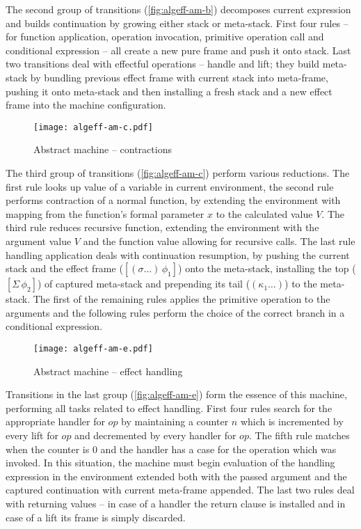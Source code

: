 \documentclass[inz, english, longabstract]{iithesis}
\begin{document}
The second group of transitions (\autoref{fig:algeff-am-b}) decomposes current expression and builds continuation by growing either stack or meta-stack.
First four rules -- for function application, operation invocation, primitive operation call and conditional expression -- all create a new pure frame and push it onto stack.
Last two transitions deal with effectful operations -- handle and lift; they build meta-stack by bundling previous effect frame with current stack into meta-frame, pushing it onto meta-stack and then installing a fresh stack and a new effect frame into the machine configuration.

\begin{figure}[t]
  \centering 
  \texttt{[image: algeff-am-c.pdf]}
  \caption{Abstract machine -- contractions}
  \label{fig:algeff-am-c}
\end{figure}

The third group of transitions (\autoref{fig:algeff-am-c}) perform various reductions.
The first rule looks up value of a variable in current environment, the second rule performs contraction of a normal function, by extending the environment with mapping from the function's formal parameter $ x $ to the calculated value $ V $.
The third rule reduces recursive function, extending the environment with the argument value $ V $ and the function value allowing for recursive calls.
The last rule handling application deals with continuation resumption, by pushing the current stack and the effect frame ($ [(\sigma \ldots) \, \phi_1] $) onto the meta-stack, installing the top ($ [\Sigma \, \phi_2] $) of captured meta-stack and prepending its tail ($ (\kappa_1 \ldots) $) to the meta-stack.
The first of the remaining rules applies the primitive operation to the arguments and the following rules perform the choice of the correct branch in a conditional expression.

\begin{figure}[t]
  \centering
  \texttt{[image: algeff-am-e.pdf]}
  \caption{Abstract machine -- effect handling}
  \label{fig:algeff-am-e}
\end{figure}

Transitions in the last group (\autoref{fig:algeff-am-e}) form the essence of this machine, performing all tasks related to effect handling.
First four rules search for the appropriate handler for $ op $ by maintaining a counter $ n $ which is incremented by every lift for $ op $ and decremented by every handler for $ op $.
The fifth rule matches when the counter is $ 0 $ and the handler has a case for the operation which was invoked. 
In this situation, the machine must begin evaluation of the handling expression in the environment extended both with the passed argument and the captured continuation with current meta-frame appended.
The last two rules deal with returning values -- in case of a handler the return clause is installed and in case of a lift its frame is simply discarded.
\end{document}
